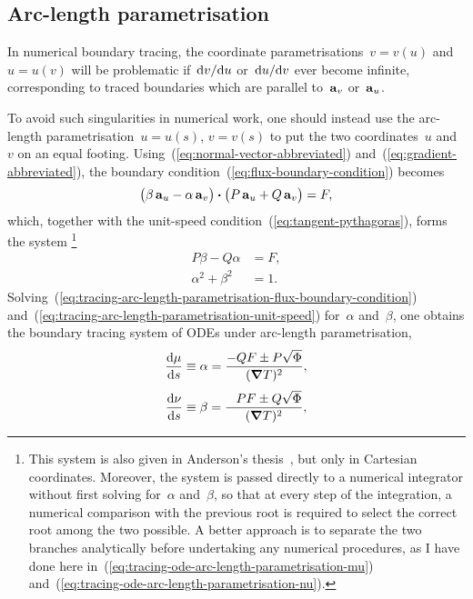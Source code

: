 \subsection{Arc-length parametrisation}
\label{sec:curvilinear.tracing.arc-length}

In numerical boundary tracing,
the coordinate parametrisations~$v = v (u)$ and~$u = u (v)$
will be problematic
if~$\td v / {\td u}$ or~$\td u / {\td v}$ ever become infinite,
corresponding to traced boundaries
which are parallel to~$\basisvec{v}$ or~$\basisvec{u}$.

To avoid such singularities in numerical work, one should instead use
the arc-length parametrisation~$u = u (s)$, $v = v(s)$
to put the two coordinates~$u$ and~$v$ on an equal footing.
Using~(\ref{eq:normal-vector-abbreviated})
and~(\ref{eq:gradient-abbreviated}),
the boundary condition~(\ref{eq:flux-boundary-condition}) becomes
\[
  \roundbr[\big]{\beta \basisvec{u} - \alpha \basisvec{v}}
    \dotp
  \roundbr[\big]{P \basisvec{u} + Q \basisvec{v}}
    =
  F,
\]
which, together with the unit-speed condition~(\ref{eq:tangent-pythagoras}),
forms the system%
\footnote{
  This system is also given
  in Anderson's thesis~\cite{anderson-2002-thesis-boundary-tracing-pdes},
  but only in Cartesian coordinates.
  Moreover, the system is passed directly to a numerical integrator
  without first solving for~$\alpha$ and~$\beta$,
  so that at every step of the integration,
  a numerical comparison with the previous root
  is required to select the correct root among the two possible.
  A better approach is to separate the two branches analytically
  before undertaking any numerical procedures,
  as I have done here
  in~(\ref{eq:tracing-ode-arc-length-parametrisation-mu})
  and~(\ref{eq:tracing-ode-arc-length-parametrisation-nu}).
}
\begin{align}
  P \beta - Q \alpha &= F,
    \label{eq:tracing-arc-length-parametrisation-flux-boundary-condition} \\
  \alpha^2 + \beta^2 &= 1.
    \label{eq:tracing-arc-length-parametrisation-unit-speed}
\end{align}
Solving~(\ref{eq:tracing-arc-length-parametrisation-flux-boundary-condition})
and~(\ref{eq:tracing-arc-length-parametrisation-unit-speed})
for~$\alpha$ and~$\beta$, one obtains
the boundary tracing system of ODEs under arc-length parametrisation,
\begin{align}
  \tder{\mu}{s} &\ideq \alpha = \frac{-Q F \pm P \sqrt{\Phi}}{(\del T)^2},
    \label{eq:tracing-ode-arc-length-parametrisation-mu} \\[\tallspace]
  \tder{\nu}{s} &\ideq \beta = \frac{\+P F \pm Q \sqrt{\Phi}}{(\del T)^2},
    \label{eq:tracing-ode-arc-length-parametrisation-nu}
\end{align}
